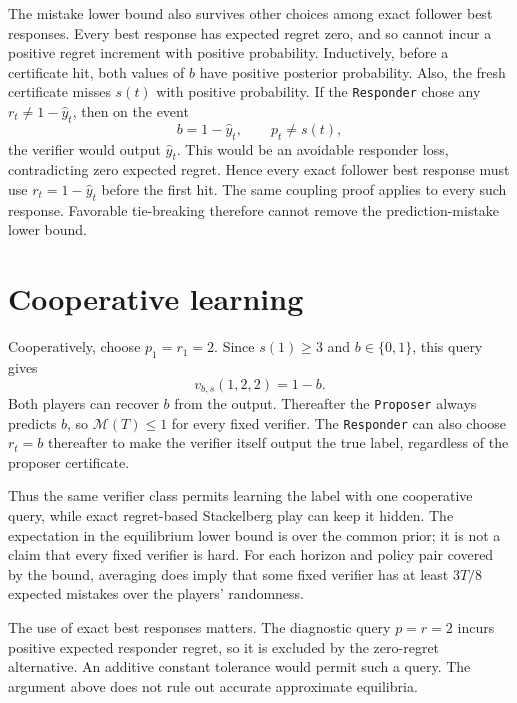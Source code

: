 \documentclass[11pt]{article}
\newcommand{\Mi}{\mathcal M}
\newcommand{\hy}{\hat y}
\newcommand{\dt}{\texttt{Proposer}\xspace}
\newcommand{\df}{\texttt{Responder}\xspace}
\begin{document}
The mistake lower bound also survives other choices among exact follower
best responses. Every best response has expected regret zero, and so
cannot incur a positive regret increment with positive probability.
Inductively, before a certificate hit, both values of $b$ have positive posterior
probability. Also, the fresh certificate misses $s(t)$ with positive
probability. If the \df chose any $r_t\ne1-\hy_t$, then on the event
\[
b=1-\hy_t,\qquad p_t\ne s(t),
\]
the verifier would output $\hy_t$. This would be an avoidable responder
loss, contradicting zero expected regret. Hence every exact follower
best response must use $r_t=1-\hy_t$ before the first hit. The same
coupling proof applies to every such response. Favorable tie-breaking
therefore cannot remove the prediction-mistake lower bound.

\section{Cooperative learning}

Cooperatively, choose $p_1=r_1=2$. Since $s(1)\ge3$ and
$b\in\{0,1\}$, this query gives
\[
v_{b,s}(1,2,2)=1-b.
\]
Both players can recover $b$ from the output. Thereafter the \dt always
predicts $b$, so $\Mi(T)\le1$ for every fixed verifier. The \df can also
choose $r_t=b$ thereafter to make the verifier itself output the true
label, regardless of the proposer certificate.

Thus the same verifier class permits learning the label with one
cooperative query, while exact regret-based Stackelberg play can keep it
hidden. The expectation in the equilibrium lower bound is over the
common prior; it is not a claim that every fixed verifier is hard. For
each horizon and policy pair covered by the bound, averaging does imply
that some fixed verifier has at least $3T/8$ expected mistakes over the
players' randomness.

The use of exact best responses matters. The diagnostic query $p=r=2$
incurs positive expected responder regret, so it is excluded by the
zero-regret alternative. An additive constant tolerance would permit
such a query. The argument above does not rule out accurate approximate
equilibria.
\end{document}
